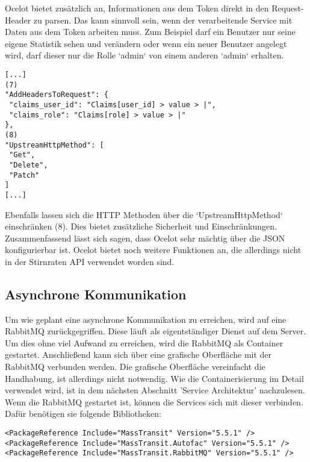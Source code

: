Ocelot bietet zusätzlich an, Informationen aus dem Token direkt in den Request-Header zu parsen. Das kann sinnvoll sein, wenn der verarbeitende Service mit Daten aus dem Token arbeiten muss. Zum Beispiel darf ein Benutzer nur seine eigene Statistik sehen und verändern oder wenn ein neuer Benutzer angelegt wird, darf dieser nur die Rolle `admin` von einem anderen `admin` erhalten.  

\begin{verbatim}
[...]
(7)
"AddHeadersToRequest": {
 "claims_user_id": "Claims[user_id] > value > |",
 "claims_role": "Claims[role] > value > |"
},
(8)
"UpstreamHttpMethod": [
 "Get",
 "Delete",
 "Patch"
]
[...]
\end{verbatim}

Ebenfalls lassen sich die HTTP Methoden über die `UpstreamHttpMethod` einschränken (8). Dies bietet zusätzliche Sicherheit und Einschränkungen. \\

Zusammenfassend lässt sich sagen, dass Ocelot sehr mächtig über die JSON konfigurierbar ist. Ocelot bietet noch weitere Funktionen an, die allerdings nicht in der Stirnraten API verwendet worden sind.  

\subsection{Asynchrone  Kommunikation}

Um wie geplant eine asynchrone Kommunikation zu erreichen, wird auf eine RabbitMQ zurückgegriffen. Diese läuft als eigentständiger Dienst auf dem Server. Um dies ohne viel Aufwand zu erreichen, wird die RabbitMQ als Container gestartet. Anschließend kann sich über eine grafische Oberfläche mit der RabbitMQ verbunden werden. Die grafische Oberfläche vereinfacht die Handhabung, ist allerdings nicht notwendig. Wie die Containerisierung im Detail verwendet wird, ist in dem nächsten Abschnitt 'Service Architektur' nachzulesen.\\

Wenn die RabbitMQ gestartet ist, können die Services sich mit dieser verbinden. Dafür benötigen sie folgende Bibliotheken:

\begin{verbatim}
<PackageReference Include="MassTransit" Version="5.5.1" />
<PackageReference Include="MassTransit.Autofac" Version="5.5.1" />
<PackageReference Include="MassTransit.RabbitMQ" Version="5.5.1" />
\end{verbatim}

